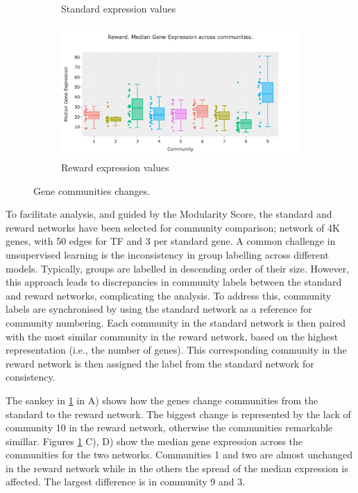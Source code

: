 {\begin{figure}[!htb]
\begin{subfigure}[b]{0.47\textwidth}
        \caption{Standard expression values}
    \end{subfigure}
    \hfill
    \begin{subfigure}[b]{0.47\textwidth}
        \centering
        \includegraphics[width=\textwidth,keepaspectratio]{Sections/Network_I/Resources/P0/Comms/P0_norm3_4K_50TF_med.png}
        \caption{Reward expression values}
    \end{subfigure}
    \hfill
    \caption{Gene communities changes.}
    \label{fig:N_I:p0_comm_chgs}
\end{figure}


To facilitate analysis, and guided by the Modularity Score, the standard and reward networks have been selected for community comparison; network of 4K genes, with 50 edges for TF and 3 per standard gene. A common challenge in unsupervised learning is the inconsistency in group labelling across different models. Typically, groups are labelled in descending order of their size. However, this approach leads to discrepancies in community labels between the standard and reward networks, complicating the analysis. To address this, community labels are synchronised by using the standard network as a reference for community numbering. Each community in the standard network is then paired with the most similar community in the reward network, based on the highest representation (i.e., the number of genes). This corresponding community in the reward network is then assigned the label from the standard network for consistency.

The sankey in \cref{fig:N_I:p0_comm_chgs} in A) shows 
how the genes change communities from the standard to the reward network. The biggest change is represented by the lack of community 10 in the reward network, otherwise the communities remarkable simillar. Figures \ref{fig:N_I:p0_comm_chgs} C), D) show the median gene expression across the communities for the two networks. Communities 1 and two are almost unchanged in the reward network while in the others the spread of the median expression is affected. The largest difference is in community 9 and 3.  

}
